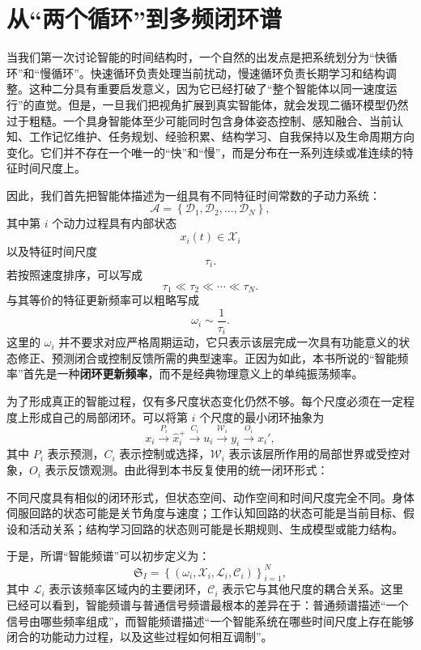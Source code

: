 \section{从“两个循环”到多频闭环谱}

当我们第一次讨论智能的时间结构时，一个自然的出发点是把系统划分为“快循环”和“慢循环”。快速循环负责处理当前扰动，慢速循环负责长期学习和结构调整。这种二分具有重要启发意义，因为它已经打破了“整个智能体以同一速度运行”的直觉。但是，一旦我们把视角扩展到真实智能体，就会发现二循环模型仍然过于粗糙。一个具身智能体至少可能同时包含身体姿态控制、感知融合、当前认知、工作记忆维护、任务规划、经验积累、结构学习、自我保持以及生命周期方向变化。它们并不存在一个唯一的“快”和“慢”，而是分布在一系列连续或准连续的特征时间尺度上。

因此，我们首先把智能体描述为一组具有不同特征时间常数的子动力系统：
\[
\mathcal{A}
=
\left\{
\mathcal{D}_1,
\mathcal{D}_2,
\ldots,
\mathcal{D}_N
\right\},
\]
其中第 $i$ 个动力过程具有内部状态
\[
x_i(t)\in\mathcal{X}_i
\]
以及特征时间尺度
\[
\tau_i.
\]
若按照速度排序，可以写成
\[
\tau_1
\ll
\tau_2
\ll
\cdots
\ll
\tau_N.
\]
与其等价的特征更新频率可以粗略写成
\[
\omega_i
\sim
\frac{1}{\tau_i}.
\]
这里的 $\omega_i$ 并不要求对应严格周期运动，它只表示该层完成一次具有功能意义的状态修正、预测闭合或控制反馈所需的典型速率。正因为如此，本书所说的“智能频率”首先是一种\textbf{闭环更新频率}，而不是经典物理意义上的单纯振荡频率。

为了形成真正的智能过程，仅有多尺度状态变化仍然不够。每个尺度必须在一定程度上形成自己的局部闭环。可以将第 $i$ 个尺度的最小闭环抽象为
\[
x_i
\xrightarrow{P_i}
\hat{x}_{i}^{+}
\xrightarrow{C_i}
u_i
\xrightarrow{\mathcal{W}_i}
y_i
\xrightarrow{O_i}
x_i',
\]
其中 $P_i$ 表示预测，$C_i$ 表示控制或选择，$\mathcal{W}_i$ 表示该层所作用的局部世界或受控对象，$O_i$ 表示反馈观测。由此得到本书反复使用的统一闭环形式：
\begin{statementbox}
\centering
{}
\end{statementbox}
不同尺度具有相似的闭环形式，但状态空间、动作空间和时间尺度完全不同。身体伺服回路的状态可能是关节角度与速度；工作认知回路的状态可能是当前目标、假设和活动关系；结构学习回路的状态则可能是长期规则、生成模型或能力结构。

于是，所谓“智能频谱”可以初步定义为：
\[
\mathfrak{S}_{I}
=
\left\{
\left(
\omega_i,
\mathcal{X}_i,
\mathcal{L}_i,
\mathcal{C}_i
\right)
\right\}_{i=1}^{N},
\]
其中 $\mathcal{L}_i$ 表示该频率区域内的主要闭环，$\mathcal{C}_i$ 表示它与其他尺度的耦合关系。这里已经可以看到，智能频谱与普通信号频谱最根本的差异在于：普通频谱描述“一个信号由哪些频率组成”，而智能频谱描述“一个智能系统在哪些时间尺度上存在能够闭合的功能动力过程，以及这些过程如何相互调制”。

